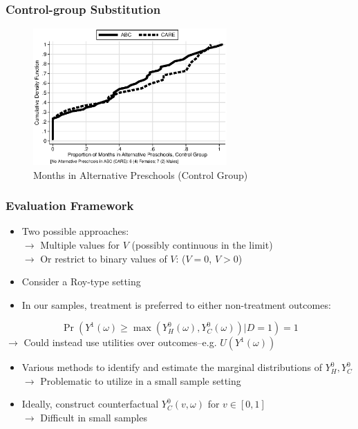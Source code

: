 \documentclass[static]{JJH-Beamer}
\begin{document}

\begin{frame}
\frametitle{Control-group Substitution}\label{substitution}
\begin{figure}
\caption{Months in Alternative Preschools (Control Group)}
	\includegraphics[width=20em]{output/abccare_controlcontamination.eps}
\end{figure}
\hyperlink{abc_subsidized}{}
\hyperlink{care_subsidized}{}
\end{frame}


\begin{frame}
\frametitle{Evaluation Framework}
\begin{itemize}
	\item Two possible approaches: \\
		$\rightarrow$ Multiple values for $V$ (possibly continuous in the limit) \\
		$\rightarrow$ Or restrict to binary values of $V$:  ($V=0$, $V>0$)
	\item Consider a Roy-type setting
	\item In our samples, treatment is preferred to either non-treatment outcomes: 
\end{itemize}

	\begin{equation}
		\Pr \left( Y^1 (\omega)  \geq \max \left( Y_H^0  (\omega) , Y_C^0  (\omega)\right)  | D = 1 \right) = 1
	\end{equation}
$\rightarrow$ Could instead use utilities over outcomes--e.g. $U \left( Y^1(\omega) \right)$
\begin{itemize}
	\item Various methods to identify and estimate the marginal distributions of $Y_H^0, Y_C^0$ \\
	$\rightarrow$ Problematic to utilize in a small sample setting 
	\item Ideally, construct counterfactual $Y_C^0 \left( v, \omega \right)$ for $v \in [0,1]$ \\
	$\rightarrow$ Difficult in small samples
\end{itemize}
\end{frame}
\end{document}
